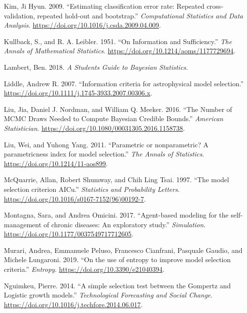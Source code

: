 \documentclass[12pt,]{article}
\begin{document}
\leavevmode\hypertarget{ref-Kim2009}{}%
Kim, Ji Hyun. 2009. ``Estimating classification error rate: Repeated cross-validation, repeated hold-out and bootstrap.'' \emph{Computational Statistics and Data Analysis}. \url{https://doi.org/10.1016/j.csda.2009.04.009}.

\leavevmode\hypertarget{ref-Kullback1951}{}%
Kullback, S., and R. A. Leibler. 1951. ``On Information and Sufficiency.'' \emph{The Annals of Mathematical Statistics}. \url{https://doi.org/10.1214/aoms/1177729694}.

\leavevmode\hypertarget{ref-Lambert2018}{}%
Lambert, Ben. 2018. \emph{A Students Guide to Bayesian Statistics}.

\leavevmode\hypertarget{ref-Liddle2007}{}%
Liddle, Andrew R. 2007. ``Information criteria for astrophysical model selection.'' \url{https://doi.org/10.1111/j.1745-3933.2007.00306.x}.

\leavevmode\hypertarget{ref-Liu2016}{}%
Liu, Jia, Daniel J. Nordman, and William Q. Meeker. 2016. ``The Number of MCMC Draws Needed to Compute Bayesian Credible Bounds.'' \emph{American Statistician}. \url{https://doi.org/10.1080/00031305.2016.1158738}.

\leavevmode\hypertarget{ref-Liu2011}{}%
Liu, Wei, and Yuhong Yang. 2011. ``Parametric or nonparametric? A parametricness index for model selection.'' \emph{The Annals of Statistics}. \url{https://doi.org/10.1214/11-aos899}.

\leavevmode\hypertarget{ref-McQuarrie1997}{}%
McQuarrie, Allan, Robert Shumway, and Chih Ling Tsai. 1997. ``The model selection criterion AICu.'' \emph{Statistics and Probability Letters}. \url{https://doi.org/10.1016/s0167-7152(96)00192-7}.

\leavevmode\hypertarget{ref-Montagna2017}{}%
Montagna, Sara, and Andrea Omicini. 2017. ``Agent-based modeling for the self-management of chronic diseases: An exploratory study.'' \emph{Simulation}. \url{https://doi.org/10.1177/0037549717712605}.

\leavevmode\hypertarget{ref-Murari2019}{}%
Murari, Andrea, Emmanuele Peluso, Francesco Cianfrani, Pasquale Gaudio, and Michele Lungaroni. 2019. ``On the use of entropy to improve model selection criteria.'' \emph{Entropy}. \url{https://doi.org/10.3390/e21040394}.

\leavevmode\hypertarget{ref-Nguimkeu2014}{}%
Nguimkeu, Pierre. 2014. ``A simple selection test between the Gompertz and Logistic growth models.'' \emph{Technological Forecasting and Social Change}. \url{https://doi.org/10.1016/j.techfore.2014.06.017}.
\end{document}
